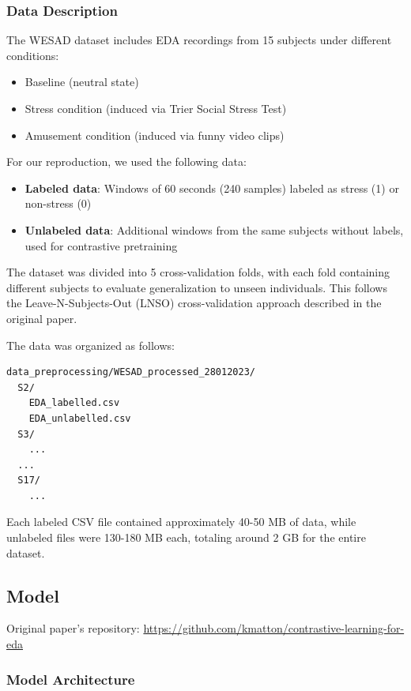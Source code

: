 \documentclass[10pt,letterpaper,twocolumn]{article}
\begin{document}
\subsubsection{Data Description}

The WESAD dataset includes EDA recordings from 15 subjects under different conditions:
\begin{itemize}
    \item Baseline (neutral state)
    \item Stress condition (induced via Trier Social Stress Test)
    \item Amusement condition (induced via funny video clips)
\end{itemize}

For our reproduction, we used the following data:
\begin{itemize}
    \item \textbf{Labeled data}: Windows of 60 seconds (240 samples) labeled as stress (1) or non-stress (0)
    \item \textbf{Unlabeled data}: Additional windows from the same subjects without labels, used for contrastive pretraining
\end{itemize}

The dataset was divided into 5 cross-validation folds, with each fold containing different subjects to evaluate generalization to unseen individuals. This follows the Leave-N-Subjects-Out (LNSO) cross-validation approach described in the original paper.

The data was organized as follows:
\begin{verbatim}
data_preprocessing/WESAD_processed_28012023/
  S2/
    EDA_labelled.csv
    EDA_unlabelled.csv
  S3/
    ...
  ...
  S17/
    ...
\end{verbatim}

Each labeled CSV file contained approximately 40-50 MB of data, while unlabeled files were 130-180 MB each, totaling around 2 GB for the entire dataset.

\subsection{Model}

Original paper's repository: \url{https://github.com/kmatton/contrastive-learning-for-eda}

\subsubsection{Model Architecture}
\end{document}
